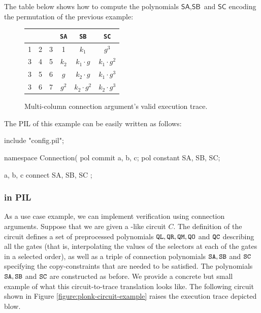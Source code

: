 The table below shows how to compute the polynomials $\textsf{SA}, \textsf{SB}$ and $\textsf{SC}$ encoding the permutation of the previous example:
\begin{figure}[H]
    \centering
    \begin{tabular}{|c|c|c|c|c|c|}
        \hline
        \att	&\btt	&\ctt	     				        &\texttt{SA}	&\texttt{SB}			&\texttt{SC}			\\ \hline
        1					&2					&\cellcolor{cyan}3						&1				&$k_1$					&\cellcolor{cyan}$g^3$				\\
        \cellcolor{cyan} 3	&4					&\cellcolor{pink} 5 	&\cellcolor{cyan}$k_2$			&$k_1 \cdot g$		&\cellcolor{pink} $k_1 \cdot g^2$	\\
        \cellcolor{cyan} 3	&\cellcolor{pink} 5	&\cellcolor{brown} 6 	&\cellcolor{cyan}$g$		&\cellcolor{pink}$k_2 \cdot g$		&\cellcolor{brown} $k_1 \cdot g^3$	\\
        \cellcolor{cyan} 3	&\cellcolor{brown}6	&7 						&\cellcolor{cyan}$g^2$		&\cellcolor{brown}$k_2 \cdot g^2$	&$k_2 \cdot g^3$	\\
        \hline
    \end{tabular}
    \caption{Multi-column connection argument's valid execution trace. }
    \label{table:connection-arg-complex-example-permutation-poly}
\end{figure}

The PIL of this example can be easily written as follows:
\begin{pil}
    include "config.pil";
    
    namespace Connection(%
    pol commit a, b, c;
    pol constant SA, SB, SC;
    
    { a, b, c } connect { SA, SB, SC };
\end{pil}


\subsubsection{\plonk in PIL}

As a use case example, we can implement \plonk verification using connection arguments. Suppose that we are given a \plonk-like circuit $C$. The definition of the circuit defines a set of preprocessed polynomials $\mathtt{QL}, \mathtt{QR}, \mathtt{QM}, \mathtt{QO}$ and $\mathtt{QC}$ describing all the \plonk gates (that is, interpolating the values of the \plonk selectors at each of the gates in a selected order), as well as a triple of connection polynomials $\mathtt{SA}, \mathtt{SB}$ and $\mathtt{SC}$ specifying the copy-constraints that are needed to be satisfied. The polynomials $\mathtt{SA}, \mathtt{SB}$ and $\mathtt{SC}$ are constructed as before. We provide a concrete but small example of what this circuit-to-trace translation looks like. The following \plonk circuit shown in Figure \ref{figure:plonk-circuit-example} raises the execution trace depicted blow.


